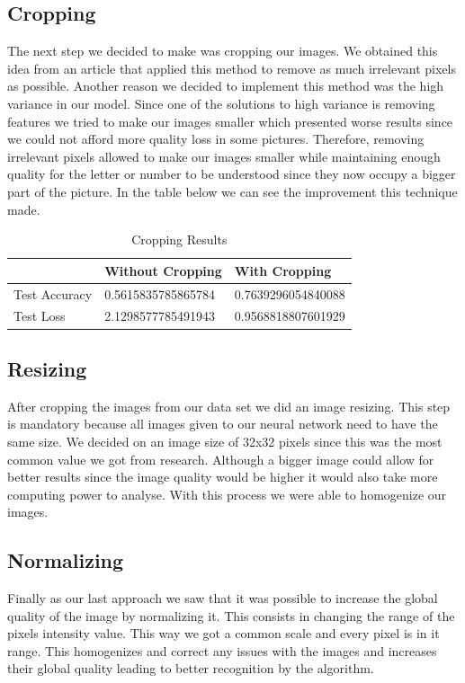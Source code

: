 \documentclass[conference]{IEEEtran}
\begin{document}
\subsection{Cropping}
The next step we decided to make was cropping our images. We obtained this idea from an article \cite{M} that applied this method to remove as much irrelevant pixels as possible. Another reason we decided to implement this method was the high variance in our model. Since one of the solutions to high variance is removing features we tried to make our images smaller which presented worse results since we could not afford more quality loss in some pictures. Therefore, removing irrelevant pixels allowed to make our images smaller while maintaining enough quality for the letter or number to be understood since they now occupy a bigger part of the picture. In the table below we can see the improvement this technique made.

\begin{table}[H]
\centering
\caption{Cropping Results}
\begin{tabular}{ | m{6em} | m{3cm} | m{3cm} | } 
\hline
 & Without Cropping & With Cropping\\ 
\hline
Test Accuracy & 0.5615835785865784 & 0.7639296054840088 \\
\hline
Test Loss & 2.1298577785491943 & 0.9568818807601929 \\
\hline
\end{tabular}
\end{table}

\subsection{Resizing}
After cropping the images from our data set we did an image resizing. This step is mandatory because all images given to our neural network need to have the same size. We decided on an image size of 32x32 pixels since this was the most common value we got from research. Although a bigger image could allow for better results since the image quality would be higher it would also take more computing power to analyse. With this process we were able to homogenize our images.

\subsection{Normalizing}
Finally as our last approach we saw that it was possible to increase the global quality of the image by normalizing it. This consists in changing the range of the pixels intensity value. This way we got a common scale and every pixel is in it range. This homogenizes and correct any issues with the images and increases their global quality leading to better recognition by the algorithm. 
\end{document}
